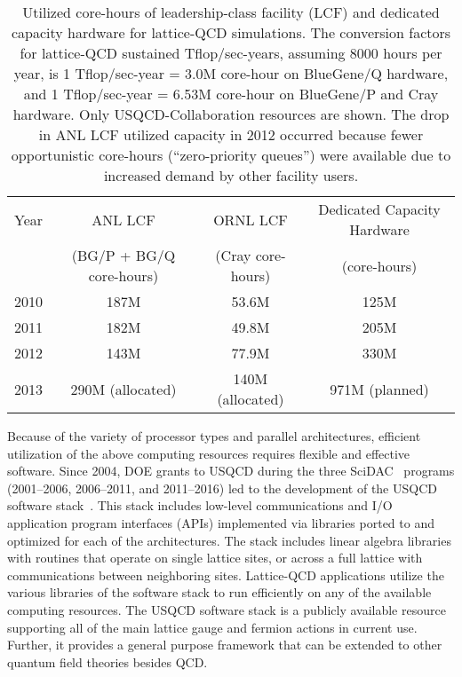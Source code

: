 \begin{table}[t]
\begin{center}
\caption{Utilized core-hours of leadership-class facility
(LCF) and dedicated capacity hardware for lattice-QCD simulations.  The
conversion factors for lattice-QCD sustained Tflop/sec-years, assuming 8000
hours per year, is 1 Tflop/sec-year = 3.0M core-hour on BlueGene/Q hardware, and 1 Tflop/sec-year = 6.53M core-hour on
BlueGene/P and Cray hardware. Only USQCD-Collaboration resources are shown.
The drop in ANL LCF utilized capacity in 2012 occurred
because fewer opportunistic core-hours (``zero-priority queues'') were
available due to increased demand by other facility users.
\vspace{1.5mm}}
\label{tab:current}
\begin{tabular}{lccc}  
\hline\hline
Year & ANL LCF & ORNL LCF & Dedicated Capacity Hardware \\[-0.75mm]
& (BG/P + BG/Q core-hours) & (Cray core-hours) & (core-hours) \\[0.5mm]  \hline
2010 & 187M & 53.6M & 125M \\
2011 & 182M & 49.8M & 205M \\
2012 & 143M & 77.9M & 330M \\
2013 & 290M (allocated) & 140M (allocated) & 971M (planned) \\ \hline\hline
\end{tabular}
\end{center}
\end{table}

Because of the variety of processor types and parallel architectures,
efficient utilization of the above computing resources requires flexible and
effective software.  Since 2004, DOE grants to USQCD during the three
SciDAC~\cite{SciDAC} programs (2001--2006, 2006--2011, and 2011--2016) led to the
development of the USQCD software stack~\cite{SciDAC-software}.  This stack
includes low-level communications and I/O application program interfaces
(APIs) implemented via libraries ported to and optimized for each of the
architectures.  The stack includes linear algebra libraries with routines that
operate on single lattice sites, or across a full lattice with communications
between neighboring sites.  Lattice-QCD applications utilize the various
libraries of the software stack to run efficiently on any of the available
computing resources.  The USQCD software stack is a publicly available
resource supporting all of the main lattice gauge and fermion actions in
current use.  Further, it provides a general purpose framework that can be
extended to other quantum field theories besides QCD.

